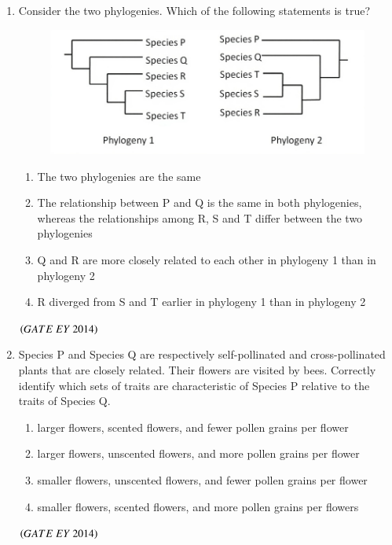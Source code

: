 \documentclass[journal]{IEEEtran}
\numberwithin{equation}{enumi}
\numberwithin{figure}{enumi}
\begin{document}
\begin{enumerate}
    \item Consider the two phylogenies. Which of the following statements is true?
    \begin{figure}[H]
    \centering
    \includegraphics[width=0.7\columnwidth]{figs/19.png}
    \caption{}
    \label{fig:19}
   \end{figure}
   \begin{enumerate}
        \item The two phylogenies are the same
        \item The relationship between P and Q is the same in both phylogenies, whereas the relationships among R, S and T differ between the two phylogenies
        \item Q and R are more closely related to each other in phylogeny 1 than in phylogeny 2
        \item R diverged from S and T earlier in phylogeny 1 than in phylogeny 2
    \end{enumerate}
    \hfill{$\brak{ GATE\ EY\ 2014}$}
    \bigskip

    \item Species P and Species Q are respectively self-pollinated and cross-pollinated plants that are closely related. Their flowers are visited by bees. Correctly identify which sets of traits are characteristic of Species P relative to the traits of Species Q.
    \begin{enumerate}
        \item larger flowers, scented flowers, and fewer pollen grains per flower
        \item larger flowers, unscented flowers, and more pollen grains per flower
        \item smaller flowers, unscented flowers, and fewer pollen grains per flower
        \item smaller flowers, scented flowers, and more pollen grains per flowers
    \end{enumerate}
    \hfill{$\brak{ GATE\ EY\ 2014}$}
    \bigskip
    

\end{enumerate}
\end{document}
